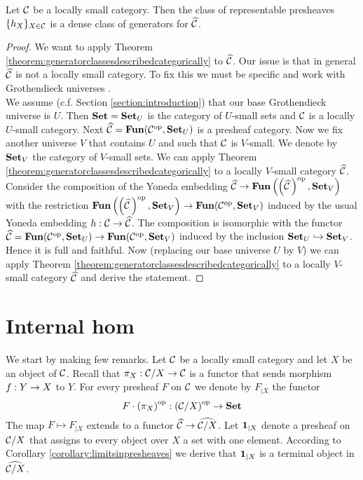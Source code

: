 \begin{corollary}\label{corollary:representablesaredensegenerators}
Let ${\mathcal C}$ be a locally small category. Then the class of representable presheaves $\{h_X\}_{X\in {\mathcal C}}$ is a dense class of generators for $\widehat{{\mathcal C}}$.
\end{corollary}
\begin{proof}
We want to apply Theorem \ref{theorem:generatorclassesdescribedcategorically} to $\widehat{{\mathcal C}}$. Our issue is that in general $\widehat{{\mathcal C}}$ is not a locally small category. To fix this we must be specific and work with Grothendieck universes {\cite[page 22]{Maclane}}.\\
We assume (c.f. Section \ref{section:introduction}) that our base Grothendieck universe is $U$. Then $\mathbf{Set} = \mathbf{Set}_{U}$ is the category of $U$-small sets and ${\mathcal C}$ is a locally $U$-small category. Next $\widehat{{\mathcal C}} = \mathbf{Fun}({\mathcal C}^{\mathrm{op}},\mathbf{Set}_{U})$ is a presheaf category. Now we fix another universe $V$ that contains $U$ and such that ${\mathcal C}$ is $V$-small. We denote by $\mathbf{Set}_V$ the category of $V$-small sets. We can apply Theorem \ref{theorem:generatorclassesdescribedcategorically} to a locally $V$-small category $\widehat{{\mathcal C}}$. Consider the composition of the Yoneda embedding $\widehat{{\mathcal C}}\rightarrow \mathbf{Fun}\left(\left(\widehat{{\mathcal C}}\,\right)^{\mathrm{op}},\mathbf{Set}_V\right)$ with the restriction $\mathbf{Fun}\left(\left(\widehat{{\mathcal C}}\,\right)^{\mathrm{op}},\mathbf{Set}_V\right)\rightarrow \mathbf{Fun}({\mathcal C}^{\mathrm{op}},\mathbf{Set}_V)$ induced by the usual Yoneda embedding $h:{\mathcal C}\rightarrow \widehat{{\mathcal C}}$. The composition is isomorphic with the functor $\widehat{{\mathcal C}} = \mathbf{Fun}({\mathcal C}^{\mathrm{op}},\mathbf{Set}_U)\rightarrow \mathbf{Fun}({\mathcal C}^{\mathrm{op}},\mathbf{Set}_V)$ induced by the inclusion $\mathbf{Set}_U\hookrightarrow \mathbf{Set}_V$. Hence it is full and faithful. Now (replacing our base universe $U$ by $V$) we can apply Theorem \ref{theorem:generatorclassesdescribedcategorically} to a locally $V$-small category $\widehat{{\mathcal C}}$ and derive the statement.
\end{proof}

\section{Internal hom}
\noindent
We start by making few remarks. Let ${\mathcal C}$ be a locally small category and let $X$ be an object of ${\mathcal C}$. Recall that $\pi_X:{\mathcal C}/X\rightarrow {\mathcal C}$ is a functor that sends morphism $f:Y\rightarrow X$ to $Y$. For every presheaf $F$ on ${\mathcal C}$ we denote by $F_{\mid X}$ the functor
$$F\cdot \left(\pi_X\right)^{\mathrm{op}}:\left({\mathcal C}/X\right)^{\mathrm{op}}\rightarrow \mathbf{Set}$$
The map $F\mapsto F_{\mid X}$ extends to a functor $\widehat{{\mathcal C}}\rightarrow \widehat{{\mathcal C}/X}$.  Let $\mathbf{1}_{\mid X}$ denote a presheaf on ${\mathcal C}/X$ that assigns to every object over $X$ a set with one element. According to Corollary \ref{corollary:limitsinpresheaves} we derive that $\mathbf{1}_{\mid X}$ is a terminal object in $\widehat{{\mathcal C}/X}$. 

